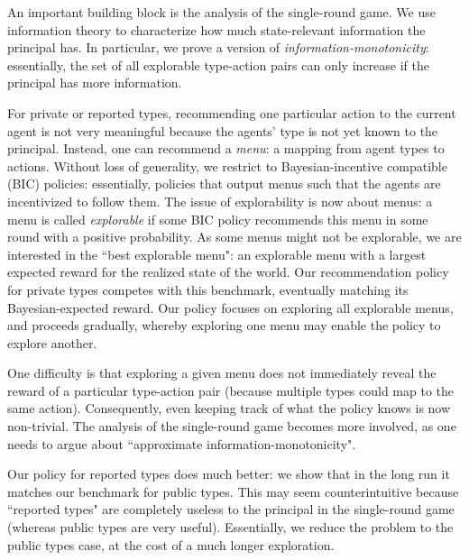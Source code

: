 An important building block is the analysis of the single-round game. We use information theory to characterize how much state-relevant information the principal has. In particular, we prove a version of \emph{information-monotonicity}: essentially, the set of all explorable type-action pairs can only increase if the principal has more information.


For private or reported types, recommending one particular action to the current agent is not very meaningful because the agents' type is not yet known to the principal. Instead, one can recommend a \emph{menu}: a mapping from agent types to actions. Without loss of generality, we restrict to  Bayesian-incentive compatible (BIC) policies: essentially, policies that output menus such that the agents are incentivized to follow them. The issue of explorability is now about menus: a menu is called \emph{explorable} if some BIC policy recommends this menu in some round with a positive probability. As some menus might not be explorable, we are interested in the ``best explorable menu": an explorable menu with a largest expected reward for the realized state of the world. Our recommendation policy for private types competes with this benchmark, eventually matching its Bayesian-expected reward. Our policy focuses on exploring all explorable menus, and proceeds gradually, whereby exploring one menu may enable the policy to explore another.

One difficulty is that exploring a given menu does not immediately reveal the reward of a particular type-action pair (because multiple types could map to the same action). Consequently, even keeping track of what the policy knows is now non-trivial. The analysis of the single-round game becomes more involved, as one needs to argue about ``approximate information-monotonicity".

Our policy for reported types does much better: we show that in the long run it matches our benchmark for public types. This may seem counterintuitive because ``reported types" are completely useless to the principal in the single-round game (whereas public types are very useful). Essentially, we reduce the problem to the public types case, at the cost of a much longer exploration.

